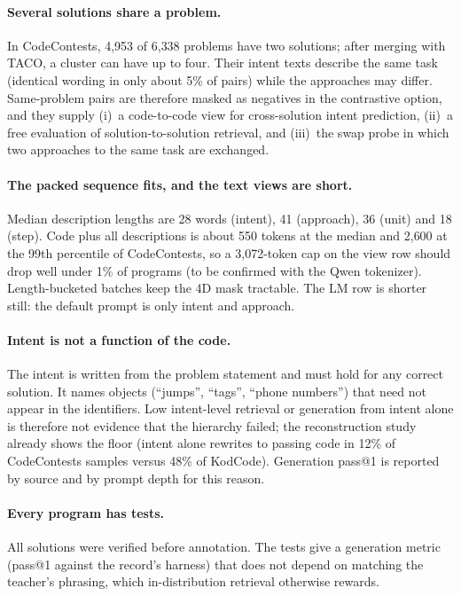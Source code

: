 \documentclass[11pt]{article}
\begin{document}
\paragraph{Several solutions share a problem.}
In CodeContests, 4{,}953 of 6{,}338 problems have two solutions; after merging with TACO, a cluster can have up to
four. Their intent texts describe the same task (identical wording in only about 5\% of pairs) while the approaches
may differ. Same-problem pairs are therefore masked as negatives in the contrastive option, and they supply
(i)~a code-to-code view for cross-solution intent prediction, (ii)~a free evaluation of solution-to-solution
retrieval, and (iii)~the swap probe in which two approaches to the same task are exchanged.

\paragraph{The packed sequence fits, and the text views are short.}
Median description lengths are 28 words (intent), 41 (approach), 36 (unit) and 18 (step). Code plus all descriptions
is about 550 tokens at the median and 2{,}600 at the 99th percentile of CodeContests, so a 3{,}072-token cap on the
view row should drop well under 1\% of programs (to be confirmed with the Qwen tokenizer). Length-bucketed batches
keep the 4D mask tractable. The LM row is shorter still: the default prompt is only intent and approach.

\paragraph{Intent is not a function of the code.}
The intent is written from the problem statement and must hold for any correct solution. It names objects
(``jumps'', ``tags'', ``phone numbers'') that need not appear in the identifiers. Low intent-level retrieval or
generation from intent alone is therefore not evidence that the hierarchy failed; the reconstruction study already
shows the floor (intent alone rewrites to passing code in 12\% of CodeContests samples versus 48\% of KodCode).
Generation pass@1 is reported by source and by prompt depth for this reason.

\paragraph{Every program has tests.}
All solutions were verified before annotation. The tests give a generation metric (pass@1 against the record's
harness) that does not depend on matching the teacher's phrasing, which in-distribution retrieval otherwise
rewards.
\end{document}
